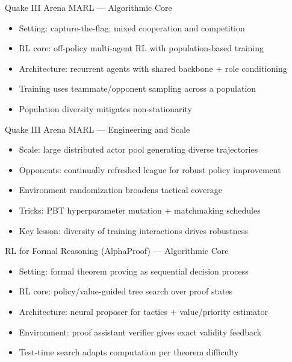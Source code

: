 \documentclass[aspectratio=169]{beamer}
\begin{document}
\begin{frame}{Quake III Arena MARL --- Algorithmic Core}
\begin{itemize}
  \item Setting: capture-the-flag; mixed cooperation and competition
  \item RL core: off-policy multi-agent RL with population-based training
  \item Architecture: recurrent agents with shared backbone + role conditioning
  \item Training uses teammate/opponent sampling across a population
  \item Population diversity mitigates non-stationarity
\end{itemize}
\end{frame}

\begin{frame}{Quake III Arena MARL --- Engineering and Scale}
\begin{itemize}
  \item Scale: large distributed actor pool generating diverse trajectories
  \item Opponents: continually refreshed league for robust policy improvement
  \item Environment randomization broadens tactical coverage
  \item Tricks: PBT hyperparameter mutation + matchmaking schedules
  \item Key lesson: diversity of training interactions drives robustness
\end{itemize}
\end{frame}

\begin{frame}{RL for Formal Reasoning (AlphaProof) --- Algorithmic Core}
\begin{itemize}
  \item Setting: formal theorem proving as sequential decision process
  \item RL core: policy/value-guided tree search over proof states
  \item Architecture: neural proposer for tactics + value/priority estimator
  \item Environment: proof assistant verifier gives exact validity feedback
  \item Test-time search adapts computation per theorem difficulty
\end{itemize}
\end{frame}
\end{document}
